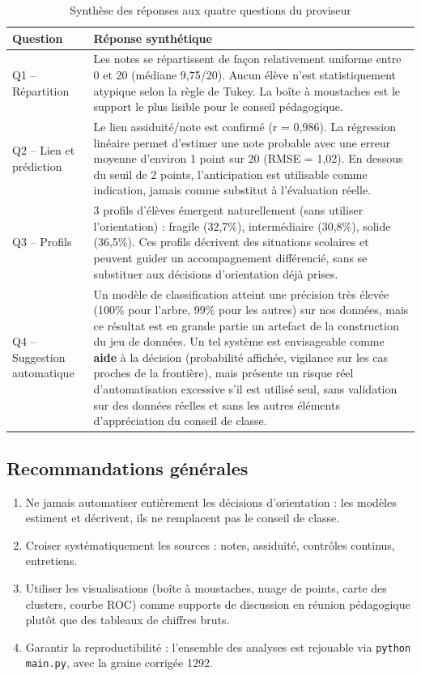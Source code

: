 \documentclass[11pt,a4paper]{article}
\begin{document}
\begin{table}[H]
\centering
\begin{tabular}{|p{2.5cm}|p{11cm}|}
\hline
\textbf{Question} & \textbf{Réponse synthétique} \\
\hline
Q1 -- Répartition &
Les notes se répartissent de façon relativement uniforme entre 0 et 20 (médiane 9,75/20).
Aucun élève n'est statistiquement atypique selon la règle de Tukey. La boîte à
moustaches est le support le plus lisible pour le conseil pédagogique. \\
\hline
Q2 -- Lien et prédiction &
Le lien assiduité/note est confirmé (r = 0,986). La régression linéaire permet d'estimer
une note probable avec une erreur moyenne d'environ 1 point sur 20 (RMSE = 1,02). En dessous du seuil
de 2 points, l'anticipation est utilisable comme indication, jamais comme substitut à
l'évaluation réelle. \\
\hline
Q3 -- Profils &
3 profils d'élèves émergent naturellement (sans utiliser l'orientation) : fragile
(32,7\%), intermédiaire (30,8\%), solide (36,5\%). Ces profils décrivent des situations
scolaires et peuvent guider un accompagnement différencié, sans se substituer aux
décisions d'orientation déjà prises. \\
\hline
Q4 -- Suggestion automatique &
Un modèle de classification atteint une précision très élevée (100\% pour l'arbre,
99\% pour les autres) sur nos données,
mais ce résultat est en grande partie un artefact de la construction du jeu de données.
Un tel système est envisageable comme \textbf{aide} à la décision (probabilité affichée,
vigilance sur les cas proches de la frontière), mais présente un risque réel
d'automatisation excessive s'il est utilisé seul, sans validation sur des données
réelles et sans les autres éléments d'appréciation du conseil de classe. \\
\hline
\end{tabular}
\caption{Synthèse des réponses aux quatre questions du proviseur}
\end{table}

\subsection{Recommandations générales}
\begin{enumerate}
\item Ne jamais automatiser entièrement les décisions d'orientation : les modèles
estiment et décrivent, ils ne remplacent pas le conseil de classe.
\item Croiser systématiquement les sources : notes, assiduité, contrôles continus,
entretiens.
\item Utiliser les visualisations (boîte à moustaches, nuage de points, carte des
clusters, courbe ROC) comme supports de discussion en réunion pédagogique plutôt que des
tableaux de chiffres bruts.
\item Garantir la reproductibilité : l'ensemble des analyses est rejouable via
\texttt{python main.py}, avec la graine corrigée 1292.
\end{enumerate}
\end{document}
